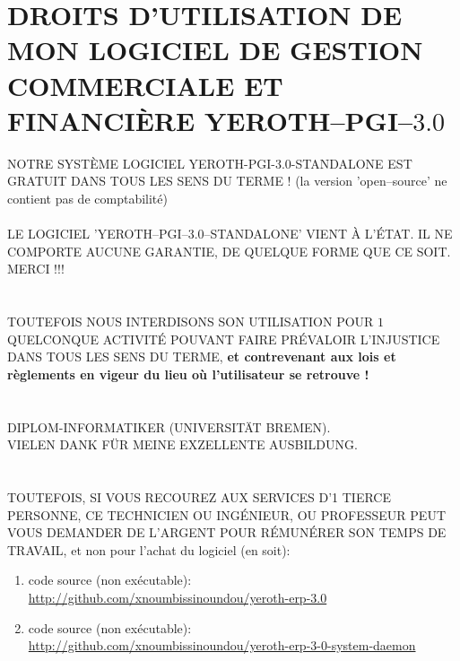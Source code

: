 \chapter{DROITS D'UTILISATION DE MON LOGICIEL DE GESTION 
  COMMERCIALE ET FINANCI\`ERE YEROTH--PGI--$3.0$}


\textcolor{yerothColorRed}{NOTRE SYST\`EME LOGICIEL
YEROTH-PGI-3.0-STANDALONE EST GRATUIT DANS TOUS LES
SENS DU TERME ! (la version 'open--source' ne contient
pas de comptabilité)\\
\\
LE LOGICIEL 'YEROTH--PGI--3.0--STANDALONE' VIENT À
L'ÉTAT. IL NE COMPORTE AUCUNE GARANTIE, DE QUELQUE
FORME QUE CE SOIT.
\\
MERCI !!!\\
\\
\\
TOUTEFOIS NOUS INTERDISONS SON UTILISATION POUR
$1$ QUELCONQUE ACTIVIT\'E POUVANT FAIRE PR\'EVALOIR
L'INJUSTICE DANS TOUS LES SENS DU TERME, \textbf{et
contrevenant aux lois et règlements en vigeur du lieu
où l'utilisateur se retrouve !}\\
\\
\\
DIPLOM-INFORMATIKER (UNIVERSITÄT BREMEN).\\
VIELEN DANK FÜR MEINE EXZELLENTE AUSBILDUNG}.\\
\\
\\
TOUTEFOIS, SI VOUS RECOUREZ AUX SERVICES D'1 TIERCE
PERSONNE, CE TECHNICIEN OU ING\'ENIEUR, OU PROFESSEUR
PEUT VOUS DEMANDER DE L'ARGENT POUR R\'EMUN\'ERER SON TEMPS DE
TRAVAIL, et non pour l'achat du logiciel (en soit):

\begin{enumerate}[1.]
	\item code source (non ex\'ecutable): \\
		{\small \url{http://github.com/xnoumbissinoundou/yeroth-erp-3.0}}
		
	\item code source (non ex\'ecutable): \\
		{\small \url{http://github.com/xnoumbissinoundou/yeroth-erp-3-0-system-daemon}}
\end{enumerate}
